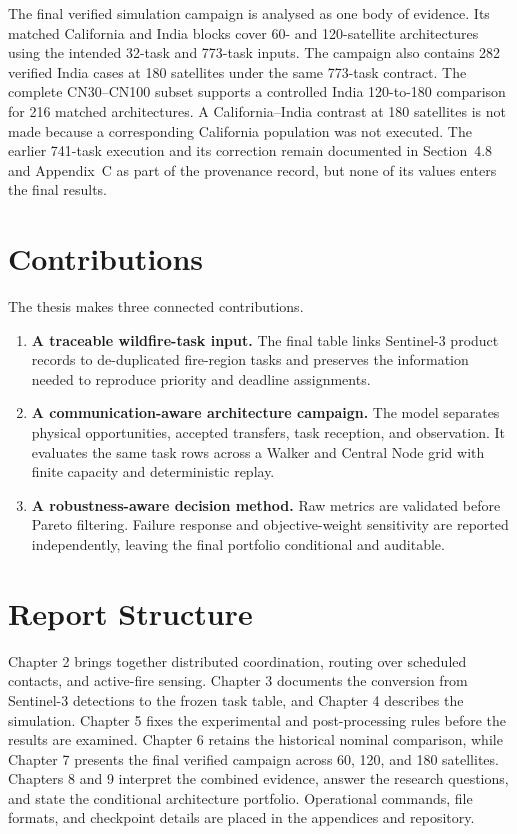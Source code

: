 The final verified simulation campaign is analysed as one body of evidence. Its matched California and India blocks cover 60- and 120-satellite architectures using the intended 32-task and 773-task inputs. The campaign also contains 282 verified India cases at 180 satellites under the same 773-task contract. The complete CN30--CN100 subset supports a controlled India 120-to-180 comparison for 216 matched architectures. A California--India contrast at 180 satellites is not made because a corresponding California population was not executed. The earlier 741-task execution and its correction remain documented in Section~4.8 and Appendix~C as part of the provenance record, but none of its values enters the final results.

\section{Contributions}
The thesis makes three connected contributions.

\begin{enumerate}
\item \textbf{A traceable wildfire-task input.} The final table links Sentinel-3 product records to de-duplicated fire-region tasks and preserves the information needed to reproduce priority and deadline assignments.
\item \textbf{A communication-aware architecture campaign.} The model separates physical opportunities, accepted transfers, task reception, and observation. It evaluates the same task rows across a Walker and Central Node grid with finite capacity and deterministic replay.
\item \textbf{A robustness-aware decision method.} Raw metrics are validated before Pareto filtering. Failure response and objective-weight sensitivity are reported independently, leaving the final portfolio conditional and auditable.
\end{enumerate}

\section{Report Structure}
Chapter 2 brings together distributed coordination, routing over scheduled contacts, and active-fire sensing. Chapter 3 documents the conversion from Sentinel-3 detections to the frozen task table, and Chapter 4 describes the simulation. Chapter 5 fixes the experimental and post-processing rules before the results are examined. Chapter 6 retains the historical nominal comparison, while Chapter 7 presents the final verified campaign across 60, 120, and 180 satellites. Chapters 8 and 9 interpret the combined evidence, answer the research questions, and state the conditional architecture portfolio. Operational commands, file formats, and checkpoint details are placed in the appendices and repository.
